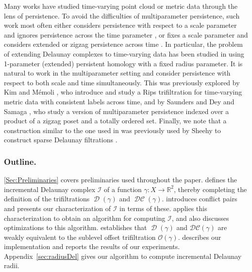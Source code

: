 \documentclass[11pt]{amsart}
\newcommand{\R}{\mathbb{R}} %
\newcommand{\DC}{\mathcal{DC}}
\DeclareMathOperator{\Del}{\mathcal{D}}
\DeclareMathOperator{\DelCech}{\mathcal{DC}}
\newcommand{\Offset}[0]{\mathcal{O}}
\newcommand{\Incr}[0]{\mathcal{I}}
\renewcommand{\subparagraph}[1]{\subsubsection*{\textbf{\textup{#1}}}}
\theoremstyle{plain}
\theoremstyle{definition}
\theoremstyle{remark}
\begin{document}
%
Many works have studied time-varying point cloud or metric data through the lens of persistence.  To avoid the difficulties of multiparameter persistence, such work most often either considers persistence with respect to a scale parameter and ignores persistence across the time parameter \cite{munch2013:thesis,adams2020topological, adams:crockerplot,guzel2022detecting,morozov2008:homological, cohen2006vines}, or fixes a scale parameter and considers extended or zigzag persistence across time \cite{tymochko2020:zigzagbifurcation, kim2020analysis, kim2024extracting}.  In particular, the problem of extending Delaunay complexes to time-varying data has been studied in \cite{kerber20133d,edelsbrunner2012medusa}  using 1-parameter (extended) persistent homology with a fixed radius parameter. 
It is natural to work in the multiparameter setting and consider persistence with respect to both scale and time simultaneously.
This was previously explored by Kim and Mémoli \cite{kim2021spatiotemporal}, who introduce and study a Rips trifiltration for time-varying metric data with consistent labels across time, and by Saunders \cite{Saunders2025ZigzagPH} and Dey and Samaga \cite{dey2026quasizigzagpersistencetopological}, who study a version of multiparameter persistence %
indexed over a product of a zigzag poset and a totally ordered set.
%
Finally, we note that a construction similar to the one used in \cite{alonsoDelaunayBifiltrationsFunctions2024} was previously used by Sheehy to construct sparse Delaunay filtrations \cite{sheehy:LIPIcs.SoCG.2021.58}.  
%
\subparagraph{Outline.} 
\cref{Sec:Preliminaries} covers preliminaries used throughout the paper.    defines the incremental Delaunay complex $\Incr$ of a function $\gamma\colon X\to\R^{2}$, thereby completing the definition of the trifiltrations  $\Del(\gamma)$ and $\DelCech(\gamma)$.     introduces conflict pairs and presents our characterization of $\Incr$ in terms of these.   applies this characterization to obtain an algorithm for computing $\Incr$, and also discusses optimizations to this algorithm.   establishes that $\Del(\gamma)$ and $\DC(\gamma)$ are weakly equivalent to the sublevel offset trifiltration $\Offset(\gamma)$. 
  describes our implementation and reports the results of our experiments.  Appendix~\ref{sec:radiusDel} gives our algorithm to compute incremental Delaunay radii.  
\end{document}
